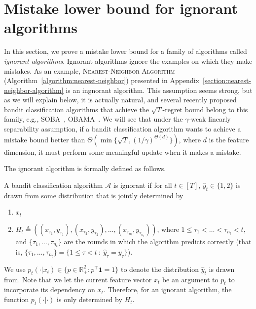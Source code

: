 \section{Mistake lower bound for ignorant algorithms}
\label{section:mistake-lower-bound-for-ignorant-algorithms}

In this section, we prove a mistake lower bound for a family of algorithms
called \textit{ignorant algorithms}. Ignorant algorithms ignore the examples on
which they make mistakes. As an example, \textsc{Nearest-Neighbor Algorithm}
(Algorithm~\ref{algorithm:nearest-neighbor}) presented in
Appendix~\ref{section:nearest-neighbor-algorithm} is an ingnorant algorithm.
This assumption seems strong, but as we will explain below, it is actually
natural, and several recently proposed bandit classification algorithms that
achieve the $\sqrt{T}$-regret bound belong to this family, e.g.,
SOBA~\citep{Beygelzimer-Orabona-Zhang-2017},
OBAMA~\citep{Foster-Kale-Luo-Mohri-Sridharan-2018}. We will see that under the
$\gamma$-weak linearly separability assumption, if a bandit classification
algorithm wants to achieve a mistake bound better than
$\Theta\left(\min\{\sqrt{T}, (1/\gamma)^{\Theta(d)}\}\right)$, where $d$ is the
feature dimension, it must perform some meaningful update when it makes a
mistake.

The ignorant algorithm is formally defined as follows.
\begin{definition} \label{definition:ignorant-algorithm}
A bandit classification algorithm $\mathcal{A}$ is ignorant if for all
$t\in[T]$, $\widehat y_t\in \{1,2\}$ is drawn from some distribution that is
jointly determined by
\begin{enumerate}
\item $x_t$
\item $H_t\triangleq \left( (x_{\tau_1}, y_{\tau_1}), (x_{\tau_2}, y_{\tau_2}), \ldots, (x_{\tau_{n_t}}, y_{\tau_{n_t}}) \right)$,
where $1 \leq \tau_1 < \dots < \tau_{n_t} < t$, and $\{\tau_1, \ldots, \tau_{n_t}\}$
are the rounds in which the algorithm predicts correctly (that is,
$\{\tau_1, \ldots, \tau_{n_t}\} = \{1 \le \tau < t ~:~ \widehat y_\tau=y_\tau\}$).
\end{enumerate}
We use $p_t(\cdot|x_t)\in \{p\in \mathbb{R}_+^2: p^\top\mathbf{1}=1\}$ to denote
the distribution $\widehat y_t$ is drawn from. Note that we let the current
feature vector $x_t$ be an argument to $p_t$ to incorporate its dependency on
$x_t$. Therefore, for an ignorant algorithm, the function $p_t(\cdot|\cdot)$ is
only determined by $H_t$.
\end{definition}

